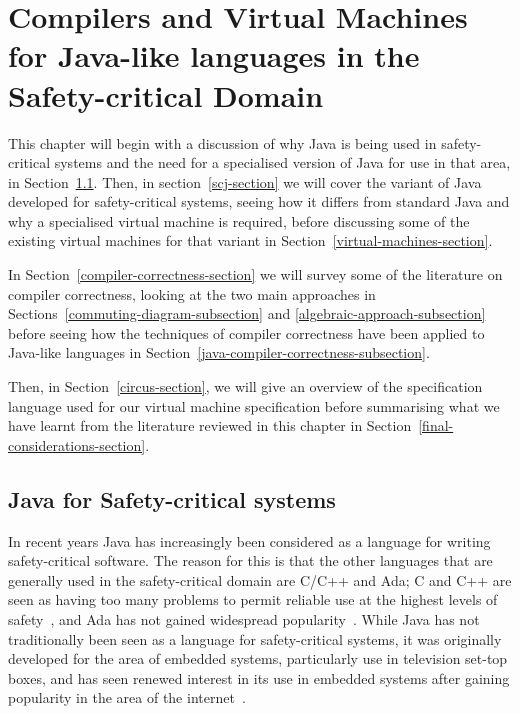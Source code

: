 \documentclass[a4paper,10pt]{report}
\begin{document}
\chapter{Compilers and Virtual Machines for Java-like languages in the
  Safety-critical Domain}
\label{literature-review-chapter}

This chapter will begin with a discussion of why Java is being used in
safety-critical systems and the need for a specialised version of Java for use
in that area, in Section~\ref{java-safety-critical-section}.  Then, in
section~\ref{scj-section} we will cover the variant of Java developed for
safety-critical systems, seeing how it differs from standard Java and why a
specialised virtual machine is required, before discussing some of the existing
virtual machines for that variant in Section~\ref{virtual-machines-section}.

In Section~\ref{compiler-correctness-section} we will survey some of the
literature on compiler correctness, looking at the two main approaches in
Sections~\ref{commuting-diagram-subsection} and
\ref{algebraic-approach-subsection} before seeing how the techniques of compiler
correctness have been applied to Java-like languages in
Section~\ref{java-compiler-correctness-subsection}.

Then, in Section~\ref{circus-section}, we will give an overview of the \Circus{}
specification language used for our virtual machine specification before
summarising what we have learnt from the literature reviewed in this chapter in
Section~\ref{final-considerations-section}.

\section{Java for Safety-critical systems}
\label{java-safety-critical-section}


In recent years Java has increasingly been considered as a language for writing
safety-critical software. The reason for this is that the other languages that
are generally used in the safety-critical domain are C/C++ and Ada; C and C++ are
seen as having too many problems to permit reliable use at the highest levels of
safety~\cite{kornecki2009}, and Ada has not gained widespread
popularity~\cite{bissyande2013}.  While Java has not traditionally been seen as
a language for safety-critical systems, it was originally developed for the area
of embedded systems, particularly use in television set-top boxes, and has seen
renewed interest in its use in embedded systems after gaining popularity in the
area of the internet~\cite{mulchandani1998}.  
\end{document}
